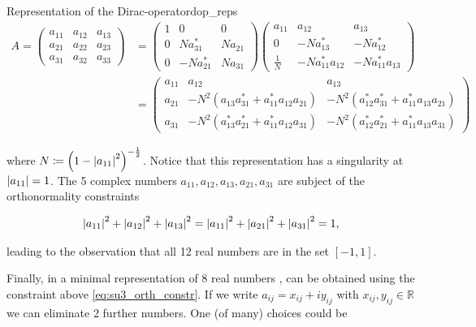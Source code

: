\documentclass{article}
\theoremstyle{plain} %
\theoremstyle{convention} %
\theoremstyle{remark} %
\numberwithin{equation}{section}
\begin{document}
\begin{proposal}{Representation of the Dirac-operator}{dop_reps}
\begin{align*}
    A =
    \begin{pmatrix}
    a_{11} & a_{12} & a_{13} \\
    a_{21} & a_{22} & a_{23} \\
    a_{31} & a_{32} & a_{33} 
    \end{pmatrix}
    &= 
    \begin{pmatrix}
    1 & 0 & 0 \\
    0 &   N a_{31}^{*} & N a_{21} \\
    0 & - N a_{21}^{*} & N a_{31}
    \end{pmatrix}
    \begin{pmatrix}
    a_{11} & a_{12} & a_{13} \\
    0 & - N a_{13}^{*} & - N a_{12}^{*} \\
    \frac{1}{N} & - N a_{11}^{*} a_{12} & - N a_{11}^{*} a_{13}
    \end{pmatrix} \\
    &= 
    \begin{pmatrix}
    a_{11} & a_{12} & a_{13} \\
    a_{21} & -N^2 \left( a_{13} a_{31}^{*} + a_{11}^{*} a_{12} a_{21} \right) & -N^2 \left( a_{12}^{*} a_{31}^{*} + a_{11}^{*} a_{13} a_{21} \right) \\
    a_{31} & -N^2 \left( a_{13}^{*} a_{21}^{*} + a_{11}^{*} a_{12} a_{31} \right) & -N^2 \left( a_{12}^{*} a_{21}^{*} + a_{11}^{*} a_{13} a_{31} \right) 
    \end{pmatrix}
\end{align*}

where $N \coloneqq \left(1 - \abs{a_{11}}^2 \right)^{-\frac{1}{2}}$. Notice that this representation has a singularity at $\abs{a_{11}}=1$. The \num{5} complex numbers $a_{11}, a_{12}, a_{13}, a_{21}, a_{31}$ are subject of the orthonormality constraints

\begin{align}
  \abs{a_{11}}^2 + \abs{a_{12}}^2 + \abs{a_{13}}^2 = \abs{a_{11}}^2 + \abs{a_{21}}^2 + \abs{a_{31}}^2 = 1, \label{eq:su3_orth_constr}
\end{align}

leading to the observation that all \num{12} real numbers are in the set $[-1, 1].$

Finally, in a minimal representation of $8$ real numbers \cite{bunk1986}, can be obtained using the constraint above \eqref{eq:su3_orth_constr}. If we write $a_{ij} = x_{ij} + i y_{ij}$ with $x_{ij}, y_{ij} \in \mathbb{R}$ we can eliminate \num{2} further numbers. One (of many) choices could be


\end{proposal}
\end{document}

